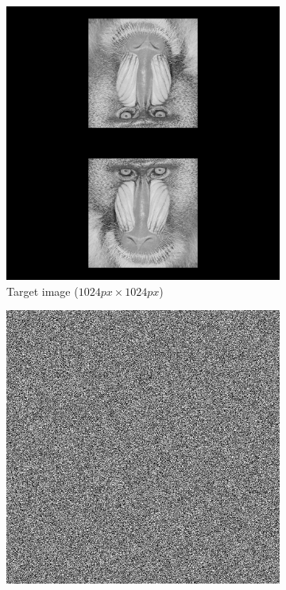 \begin{figure}[H]
  \centering
  \begin{subfigure}[t]{0.3\textwidth}
    \centering
    \includegraphics[width=\textwidth]{mandrill_2.png}
    \caption{Target image ($1024 px\times 1024 px$)}
    \label{fig:mandrill_2_DBS}
  \end{subfigure}
  \hfill
  \begin{subfigure}[t]{0.3\textwidth}
    \centering
    \includegraphics[width=\textwidth]{DBS_mandrill_2_Holo.png}

\end{subfigure}
\end{figure}
